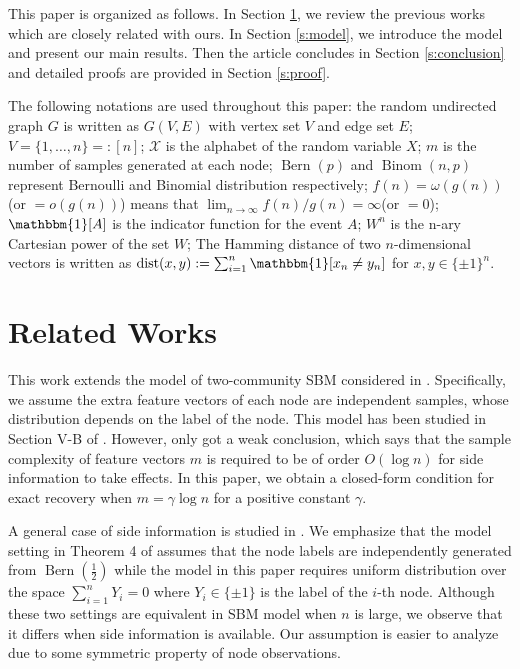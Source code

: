 \documentclass[conference]{IEEEtran}
\DeclareMathOperator{\dist}{dist}
\DeclareMathOperator{\Bern}{Bern}
\DeclareMathOperator{\Binom}{Binom}
\begin{document}
This paper is organized as follows. In Section \ref{s:rw}, we review the previous works which are closely related with ours.
In Section \ref{s:model}, we introduce the model and present our main results.
Then the article concludes in Section \ref{s:conclusion} and
detailed proofs are provided in Section \ref{s:proof}.

The following notations are used throughout this paper: 
the random undirected graph $G$ is written as $G(V,E)$ with vertex set $V$ and edge set $E$;
$V=\{1,\dots, n\} =: [n]$;
$\mathcal{X}$ is the alphabet
of the random variable $X$; $m$ is the number of samples generated at each node;
$\Bern(p)$ and $\Binom(n,p)$ represent Bernoulli
and Binomial distribution respectively; $f(n)=\omega(g(n))$(or $=o(g(n))$) means that $\lim_{n\to \infty} f(n) / g(n) = \infty $(or $=0$);
$\mathbbm{1}[A]$ is the indicator function for the event $A$; $W^n$ is the n-ary Cartesian power of the set $W$;
The Hamming distance of 
two $n$-dimensional vectors is written as $\dist(x,y):=\sum_{i=1}^n \mathbbm{1}[x_n\neq y_n]$ for $x,y\in \{\pm 1 \}^n$.

\section{Related Works}\label{s:rw}
This work extends the model of two-community SBM considered in \cite{abbe2015community}.
Specifically, we assume the extra feature vectors of each node are independent samples, whose distribution depends on the label of the node.
This model has been studied in Section V-B of \cite{saad2018community}. However,
\cite{saad2018community} only got a weak conclusion, which says that the sample complexity of feature vectors
$m$ is required to be of order $O(\log n)$ for side information to take effects. In this paper, we obtain
a closed-form condition for exact recovery when $m=\gamma \log n$ for a positive constant $\gamma$.

A general case of side information is studied
in \cite{abbe17sideinfo}. We emphasize that the model setting in Theorem 4 of \cite{abbe17sideinfo}
assumes that the node labels are independently generated  from $\Bern(\frac{1}{2})$ while the model
in this paper requires uniform distribution over the space $\sum_{i=1}^n Y_i = 0$ where $Y_i \in \{\pm 1 \}$ is the label of the $i$-th node.
Although these two settings are equivalent in
SBM model when $n$ is large, we observe that it differs when side information is available. Our assumption is easier to analyze due to some
symmetric property of node observations.
\end{document}
